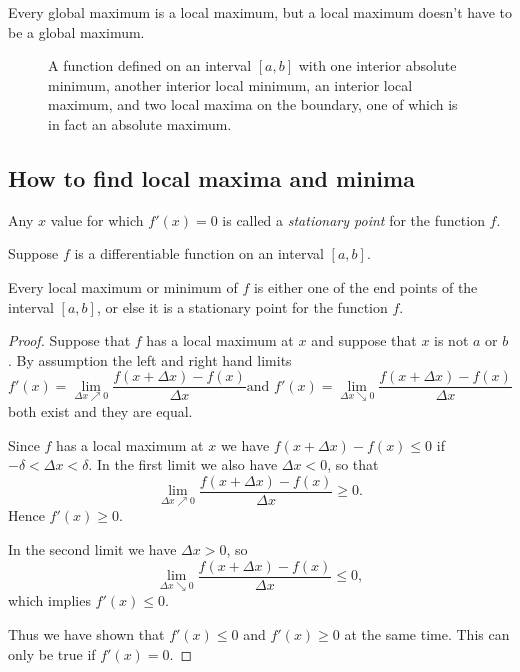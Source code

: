 Every global maximum is a local maximum, but a local maximum doesn't have to be
a global maximum.
\begin{figure}[h]
  \centering{ }
  \caption{A function defined on an interval $[a, b]$ with one interior absolute
    minimum, another interior local minimum, an interior local maximum, and two
    local maxima on the boundary, one of which is in fact an absolute maximum.}
  \label{fig:05maxAndMins}
\end{figure}

\subsection{How to find local maxima and minima} %
\label{sec:where-find-maxes}
Any $x$ value for which $f'(x) = 0$ is called a \emph{stationary point} for the
function $f$.




\begin{theorem}\label{thm:zero-deriv-at-extrema}
  Suppose $f$ is a differentiable function on an interval $[a,b]$.




  Every local maximum or minimum of $f$ is either one of the end points of the
  interval $[a,b]$, or else it is a stationary point for the function $f$.
\end{theorem}




\begin{proof}
  Suppose that $f $ has a local maximum at $x$ and suppose that $x$ is not $a$
  or $b$.  By assumption the left and right hand limits
  \[
  f'(x) = \lim_{\Delta x\nearrow 0}\frac{f(x+\Delta x)-f(x)}{\Delta x} \text{
    and } f'(x) = \lim_{\Delta x\searrow 0}\frac{f(x+\Delta x)-f(x)}{\Delta x}
  \]
  both exist and they are equal.




  Since $f$ has a local maximum at $x$ we have $f(x+\Delta x)-f(x)\leq 0$ if
  $-\delta<\Delta x<\delta$.  In the first limit we also have $\Delta x<0$, so
  that
  \[
  \lim_{\Delta x\nearrow 0}\frac{f(x+\Delta x)-f(x)}{\Delta x} \geq 0.
  \]
  Hence $f'(x) \geq 0$.


  In the second limit we have $\Delta x>0$, so
  \[
  \lim_{\Delta x\searrow 0}\frac{f(x+\Delta x)-f(x)}{\Delta x} \leq 0,
  \]
  which implies $f'(x)\leq 0$.




  Thus we have shown that $f'(x)\leq0$ and $f'(x)\geq 0$ at the same time.  This
  can only be true if $f'(x) = 0$.
\end{proof}




